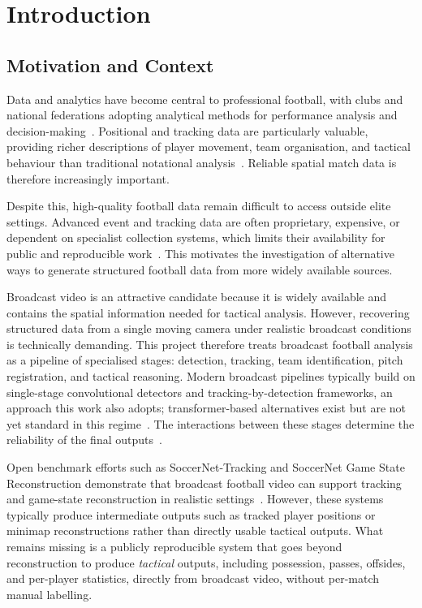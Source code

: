 \chapter{Introduction}
\label{ch:introduction}

\section{Motivation and Context}
\label{sec:motivation}

Data and analytics have become central to professional football, with clubs 
and national federations adopting analytical methods for performance analysis 
and decision-making~\cite{Lolli2024}. Positional and tracking data are 
particularly valuable, providing richer descriptions of player movement, 
team organisation, and tactical behaviour than traditional notational 
analysis~\cite{Goes2021}. Reliable spatial match data is 
therefore increasingly important.

Despite this, high-quality football data remain difficult to access outside 
elite settings. Advanced event and tracking data are often proprietary, 
expensive, or dependent on specialist collection systems, which limits their 
availability for public and reproducible work~\cite{Ellens2022,Davis2024}. 
This motivates the investigation of alternative ways to generate structured 
football data from more widely available sources.

Broadcast video is an attractive candidate because it is widely available
and contains the spatial information needed for tactical analysis.
However, recovering structured data from a single moving camera under
realistic broadcast conditions is technically demanding. This project
therefore treats broadcast football analysis as a pipeline of specialised
stages: detection, tracking, team identification, pitch registration, and
tactical reasoning. Modern broadcast pipelines typically build on
single-stage convolutional detectors and tracking-by-detection frameworks,
an approach this work also adopts; transformer-based alternatives exist
but are not yet standard in this regime~\cite{meinhardt2022trackformer}. The interactions between these
stages determine the reliability of the final outputs~\cite{Theiner2022,Somers2024}.

Open benchmark efforts such as SoccerNet-Tracking and SoccerNet Game State 
Reconstruction demonstrate that broadcast football video can support 
tracking and game-state reconstruction in realistic settings~\cite{Cioppa2022,Somers2024}. 
However, these systems typically produce intermediate outputs such as 
tracked player positions or minimap reconstructions rather than directly 
usable tactical outputs. What remains missing is a publicly reproducible 
system that goes beyond reconstruction to produce \emph{tactical} outputs, 
including possession, passes, offsides, and per-player statistics, directly 
from broadcast video, without per-match manual labelling.

